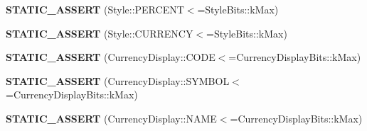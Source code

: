 \begin{DoxyCompactItemize}
{\bfseries S\+T\+A\+T\+I\+C\+\_\+\+A\+S\+S\+E\+RT} (Style\+::\+P\+E\+R\+C\+E\+NT$<$=Style\+Bits\+::k\+Max)
\item 
\mbox{\label{classv8_1_1internal_1_1JSNumberFormat_acea5d48dff3154c94f3e4f05975e5c33}} 
{\bfseries S\+T\+A\+T\+I\+C\+\_\+\+A\+S\+S\+E\+RT} (Style\+::\+C\+U\+R\+R\+E\+N\+CY$<$=Style\+Bits\+::k\+Max)
\item 
\mbox{\label{classv8_1_1internal_1_1JSNumberFormat_a01feeb17d057e6b84b4046a6e27703b7}} 
{\bfseries S\+T\+A\+T\+I\+C\+\_\+\+A\+S\+S\+E\+RT} (Currency\+Display\+::\+C\+O\+DE$<$=Currency\+Display\+Bits\+::k\+Max)
\item 
\mbox{\label{classv8_1_1internal_1_1JSNumberFormat_a15f09a15d11448e66e005fbbb848fb1f}} 
{\bfseries S\+T\+A\+T\+I\+C\+\_\+\+A\+S\+S\+E\+RT} (Currency\+Display\+::\+S\+Y\+M\+B\+OL$<$=Currency\+Display\+Bits\+::k\+Max)
\item 
\mbox{\label{classv8_1_1internal_1_1JSNumberFormat_ae8a108387ce9fe81cb4c9c45291d3b02}} 
{\bfseries S\+T\+A\+T\+I\+C\+\_\+\+A\+S\+S\+E\+RT} (Currency\+Display\+::\+N\+A\+ME$<$=Currency\+Display\+Bits\+::k\+Max)
\end{DoxyCompactItemize}
